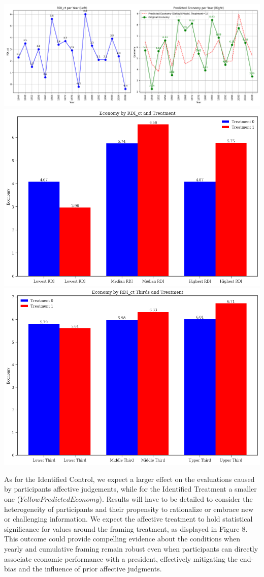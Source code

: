 \documentclass[
]{article}
\begin{document}
\includegraphics{treat_pred1.png} \includegraphics{treat_low.png}
\includegraphics{treat_third.png}

As for the Identified Control, we expect a larger effect on the
evaluations caused by participants affective judgements, while for the
Identified Treatment a smaller one (\(Yellow Predicted Economy\)).
Results will have to be detailed to consider the heterogeneity of
participants and their propensity to rationalize or embrace new or
challenging information. We expect the affective treatment to hold
statistical significance for values around the framing treatment, as
displayed in Figure 8. This outcome could provide compelling evidence
about the conditions when yearly and cumulative framing remain robust
even when participants can directly associate economic performance with
a president, effectively mitigating the end-bias and the influence of
prior affective judgments.
\end{document}
